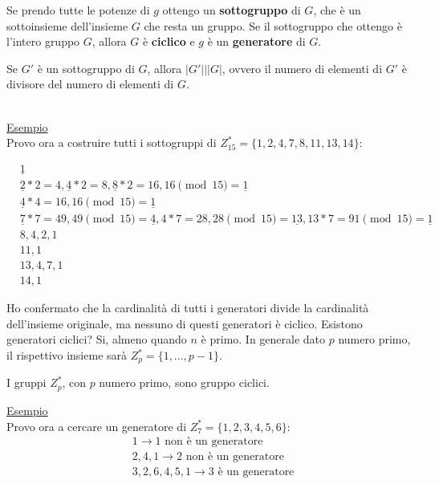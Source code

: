 Se prendo tutte le potenze di $g$ ottengo un \textbf{sottogruppo} di $G$, che è un sottoinsieme dell'insieme $G$ che resta un gruppo. Se il sottogruppo che ottengo è l'intero gruppo $G$, allora $G$ è \textbf{ciclico} e $g$ è un \textbf{generatore} di $G$.

\begin{theorem}
    Se $G'$ è un sottogruppo di $G$, allora $|G'| \bigg| |G|$, ovvero il numero di elementi di $G'$ è divisore del numero di elementi di $G$.
\end{theorem}

\noindent \\ \underline{Esempio}\\

\noindent Provo ora a costruire tutti i sottogruppi di $Z^*_{15} = \{1, 2, 4, 7, 8, 11, 13, 14\}$:

\begin{align*}
    &\underline{1}\\
    &\underline{2}*2=4, \underline{4}*2=8, \underline{8}*2=16, 16 \pmod{15} = \underline{1}\\
    &\underline{4}*4=16, 16 \pmod{15} = \underline{1}\\
    &\underline{7}*7=49, 49 \pmod{15} = \underline{4}, 4*7=28, 28 \pmod{15} = \underline{13}, 13*7 = 91 \pmod{15} = \underline{1}\\
    &8, 4, 2, 1\\
    &11, 1\\
    &13, 4, 7, 1\\
    &14, 1
\end{align*}

\noindent Ho confermato che la cardinalità di tutti i generatori divide la cardinalità dell'insieme originale, ma nessuno di questi generatori è ciclico. Esistono generatori ciclici? Si, almeno quando $n$ è primo. In generale dato $p$ numero primo, il rispettivo insieme sarà $Z^*_{p} = \{1, ..., p-1\}$.

\begin{theorem}
    I gruppi \(Z_p^*\), con \(p\) numero primo, sono gruppo ciclici.
\end{theorem}

\noindent \underline{Esempio}\\

\noindent Provo ora a cercare un generatore di $Z^*_{7} = \{1, 2, 3, 4, 5, 6\}$:
\begin{align*}
    &1 \rightarrow 1 \text{ non è un generatore}\\
    &2, 4, 1 \rightarrow 2 \text{ non è un generatore}\\
    &3, 2, 6, 4, 5, 1 \rightarrow 3 \text{ è un generatore}
\end{align*}

